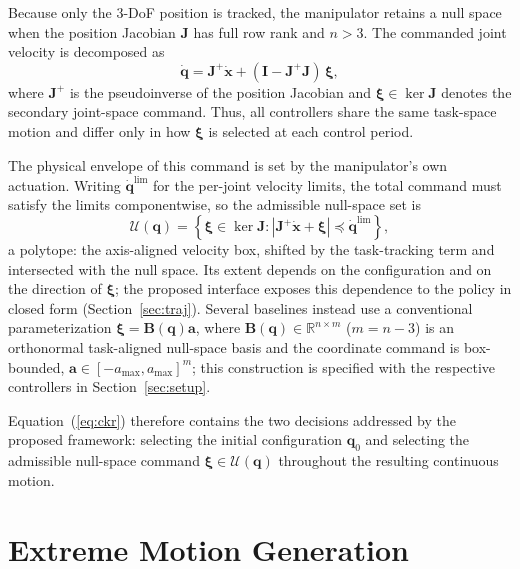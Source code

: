 \documentclass[journal, twoside]{IEEEtran}
\begin{document}
Because only the $3$-DoF position is tracked, the manipulator retains a null space when the position Jacobian $\mathbf{J}$ has full row rank and $n>3$. The commanded joint velocity is decomposed as
\begin{equation}
\label{eq:nullspace}
\dot{\mathbf{q}}
=
\mathbf{J}^{+}\dot{\mathbf{x}}
+
(\mathbf{I}-\mathbf{J}^{+}\mathbf{J})\,\boldsymbol{\xi},
\end{equation}
where $\mathbf{J}^{+}$ is the pseudoinverse of the position Jacobian and $\boldsymbol{\xi}\in\ker\mathbf{J}$ denotes the secondary joint-space command. Thus, all controllers share the same task-space motion and differ only in how $\boldsymbol{\xi}$ is selected at each control period.

The physical envelope of this command is set by the manipulator's own actuation. Writing $\dot{\mathbf{q}}^{\lim}$ for the per-joint velocity limits, the total command must satisfy the limits componentwise, so the admissible null-space set is
\begin{equation}
\label{eq:uq}
\mathcal{U}(\mathbf{q})
=
\left\{
\boldsymbol{\xi}\in\ker\mathbf{J}:
\left|\mathbf{J}^{+}\dot{\mathbf{x}}+\boldsymbol{\xi}\right|
\preceq
\dot{\mathbf{q}}^{\lim}
\right\},
\end{equation}
a polytope: the axis-aligned velocity box, shifted by the task-tracking term and intersected with the null space. Its extent depends on the configuration and on the direction of $\boldsymbol{\xi}$; the proposed interface exposes this dependence to the policy in closed form (Section~\ref{sec:traj}). Several baselines instead use a conventional parameterization $\boldsymbol{\xi}=\mathbf{B}(\mathbf{q})\mathbf{a}$, where $\mathbf{B}(\mathbf{q})\in\mathbb{R}^{n\times m}$ ($m=n-3$) is an orthonormal task-aligned null-space basis and the coordinate command is box-bounded, $\mathbf{a}\in[-a_{\max},a_{\max}]^{m}$; this construction is specified with the respective controllers in Section~\ref{sec:setup}.

Equation~(\ref{eq:ckr}) therefore contains the two decisions addressed by the proposed framework: selecting the initial configuration $\mathbf{q}_{0}$ and selecting the admissible null-space command $\boldsymbol{\xi}\in\mathcal{U}(\mathbf{q})$ throughout the resulting continuous motion.



\section{Extreme Motion Generation}
\label{sec:emg}
\end{document}
